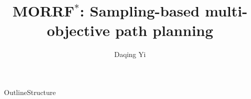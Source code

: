 \documentclass{beamer}
\title{MORRF$^{*}$: Sampling-based multi-objective path planning}
\author{Daqing Yi 
}
\institute
{
  Department of Computer Science\\
  Brigham Young University
}
\date[]{}
\begin{document}
\begin{frame}
  \titlepage
\end{frame}

\begin{frame}{Outline}{Structure}
  \tableofcontents
\end{frame}











\end{document}
